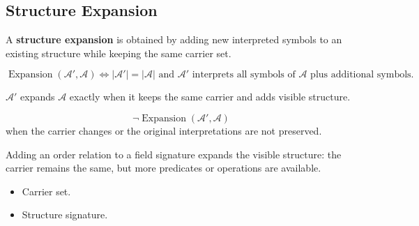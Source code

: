\subsection{Structure Expansion}
\label{subsec:structure-expansion}

\begin{definition}
\label{def:structure-expansion}
A \textbf{structure expansion} is obtained by adding new interpreted symbols to
an existing structure while keeping the same carrier set.
\end{definition}

\begin{remark*}
\[
\operatorname{Expansion}(\mathcal{A}',\mathcal{A})
\Longleftrightarrow
|\mathcal{A}'|=|\mathcal{A}|
\text{ and } \mathcal{A}' \text{ interprets all symbols of } \mathcal{A}
\text{ plus additional symbols.}
\]
\end{remark*}

\begin{remark*}
$\mathcal{A}'$ expands $\mathcal{A}$ exactly when it keeps the same carrier and
adds visible structure.
\end{remark*}

\begin{remark*}
\[
\neg\operatorname{Expansion}(\mathcal{A}',\mathcal{A})
\]
when the carrier changes or the original interpretations are not preserved.
\end{remark*}

\begin{remark*}[Interpretation]
Adding an order relation to a field signature expands the visible structure:
the carrier remains the same, but more predicates or operations are available.
\end{remark*}

\begin{remark*}[Dependencies]
\begin{itemize}
  \item Carrier set.
  \item Structure signature.
\end{itemize}
\end{remark*}
